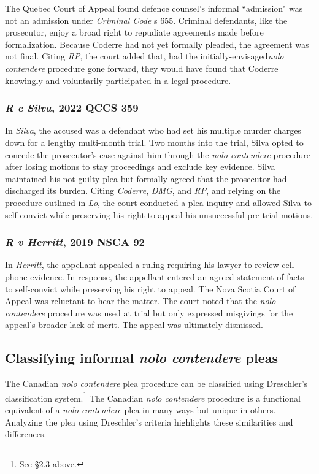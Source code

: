 The Quebec Court of Appeal found defence counsel's informal ``admission" was not an admission under \textit{Criminal Code} s 655. Criminal defendants, like the prosecutor, enjoy a broad right to repudiate agreements made before formalization. Because Coderre had not yet formally pleaded, the agreement was not final. Citing \textit{RP}, the court added that, had the initially-envisaged\textit{nolo contendere} procedure gone forward, they would have found that Coderre knowingly and voluntarily participated in a legal procedure.

\subsubsection{\textit{R c Silva}, 2022 QCCS 359}

In \textit{Silva}, the accused was a defendant who had set his multiple murder charges down for a lengthy multi-month trial. Two months into the trial, Silva opted to concede the prosecutor's case against him through the \textit{nolo contendere} procedure after losing motions to stay proceedings and exclude key evidence. Silva maintained his not guilty plea but formally agreed that the prosecutor had discharged its burden. Citing \textit{Coderre}, \textit{DMG}, and \textit{RP}, and relying on the procedure outlined in \textit{Lo}, the court conducted a plea inquiry and allowed Silva to self-convict while preserving his right to appeal his unsuccessful pre-trial motions.

\subsubsection{\textit{R v Herritt}, 2019 NSCA 92}

In \textit{Herritt}, the appellant appealed a ruling requiring his lawyer to review cell phone evidence. In response, the appellant entered an agreed statement of facts to self-convict while preserving his right to appeal. The Nova Scotia Court of Appeal was reluctant to hear the matter. The court noted that the \textit{nolo contendere} procedure was used at trial but only expressed misgivings for the appeal's broader lack of merit. The appeal was ultimately dismissed.

\subsection{Classifying informal \textit{nolo contendere} pleas}

The Canadian \textit{nolo contendere} plea procedure can be classified using Dreschler's classification system.\footnote{See §2.3 above.} The Canadian \textit{nolo contendere} procedure is a functional equivalent of a \textit{nolo contendere} plea in many ways but unique in others. Analyzing the plea using Dreschler's criteria highlights these similarities and differences.

